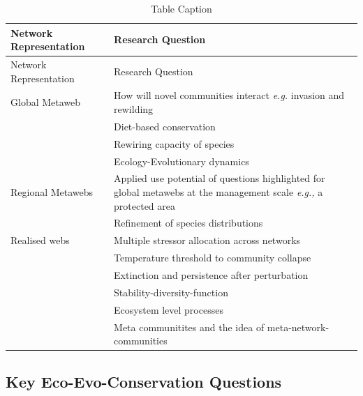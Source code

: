 \documentclass[
]{article}
\begin{document}
\begin{longtable}[]{@{}
  >{\raggedright\arraybackslash}p{}
  >{\raggedright\arraybackslash}p{}@{}}
\caption{Table Caption}\label{tbl-questions}\tabularnewline
\toprule\noalign{}
\begin{minipage}[b]{\linewidth}\raggedright
Network Representation
\end{minipage} & \begin{minipage}[b]{\linewidth}\raggedright
Research Question
\end{minipage} \\
\midrule\noalign{}
\endfirsthead
\toprule\noalign{}
\begin{minipage}[b]{\linewidth}\raggedright
Network Representation
\end{minipage} & \begin{minipage}[b]{\linewidth}\raggedright
Research Question
\end{minipage} \\
\midrule\noalign{}
\endhead
\bottomrule\noalign{}
\endlastfoot
Global Metaweb & How will novel communities interact \emph{e.g.}
invasion and rewilding \\
& Diet-based conservation \\
& Rewiring capacity of species \\
& Ecology-Evolutionary dynamics \\
Regional Metawebs & Applied use potential of questions highlighted for
global metawebs at the management scale \emph{e.g.,} a protected area \\
& Refinement of species distributions \\
Realised webs & Multiple stressor allocation across networks \\
& Temperature threshold to community collapse \\
& Extinction and persistence after perturbation \\
& Stability-diversity-function \\
& Ecosystem level processes \\
& Meta communitites and the idea of meta-network-communities \\
\end{longtable}

\subsection{Key Eco-Evo-Conservation
Questions}\label{key-eco-evo-conservation-questions}
\end{document}
